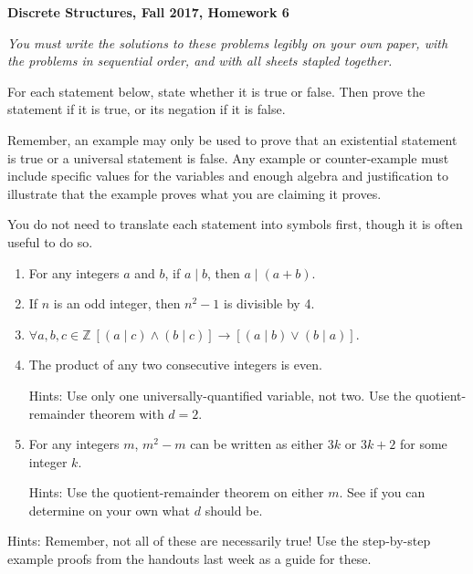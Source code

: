 \documentclass[12pt, letterpaper]{report}
\newcommand{\Z}{\mathbb{Z}}
\begin{document}
{\textbf{Discrete Structures, Fall 2017, Homework 6}}

\medbreak

\textit{You must write the solutions to these problems legibly on your own paper, with
the problems in sequential order, and with all sheets stapled together.}

\bigskip

For each statement below, state whether it is true or false. Then prove the statement if it is true,
or its negation if it is false.\medskip

Remember, an example may only be used to prove that an existential statement is true or a universal
statement is false. Any example or counter-example must include specific values for the variables
and enough algebra and justification to illustrate that the example proves what you are claiming
it proves.\medskip

You do not need to translate each statement into symbols first, though it is often useful to do so.

\begin{enumerate}

        \item For any integers $a$ and $b$, if $a \mid b$, then $a \mid (a+b)$.  %
        
        \item If $n$ is an odd integer, then $n^2-1$ is divisible by 4.  %
        
        \item $\forall a, b, c \in \Z \ [(a \mid c) \land (b \mid c)] \to [(a \mid b) \lor (b \mid a)]$.  %
        
        \item The product of any two consecutive integers is even.  
        
        Hints:  Use only one universally-quantified variable, not two.  Use the quotient-remainder theorem with $d=2$.
        
        
        
        \item For any integers $m$, $m^2-m$ can be written as either $3k$ or $3k+2$ for some integer $k$.
        
        Hints:  Use the quotient-remainder theorem on either $m$.  See if you can determine on your own what $d$ should be.          

                

\end{enumerate}
Hints: Remember, not all of these are necessarily true!  Use the step-by-step example proofs from the handouts last week
as a guide for these.
 
\end{document}
